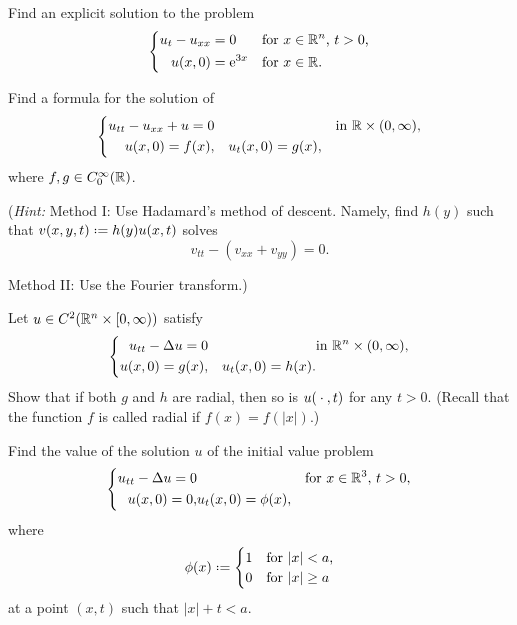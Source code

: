 \begin{problem}
  Find an explicit solution to the problem
  \[
    \left\{
      \begin{aligned}
        u_t-u_{xx}&=0&&\text{for \(x\in\mathbb{R}^n\), \(t>0\),}\\
        u(x,0)&=\mathrm{e}^{3x}&&\text{for \(x\in\mathbb{R}\).}
      \end{aligned}
    \right.
  \]
\end{problem}
\begin{solution*}
\end{solution*}

\begin{problem}
  Find a formula for the solution of
  \[
    \left\{
      \begin{aligned}
        u_{tt}-u_{xx}+u=0&&&&\text{in \(\mathbb{R}\times(0,\infty)\),}\\
        u(x,0)=f(x),&&u_t(x,0)=g(x),
      \end{aligned}
    \right.
  \]
  where \(f,g\in C_0^\infty(\mathbb{R})\).

  \noindent (\emph{Hint:} Method I: Use Hadamard's method of
  descent. Namely, find \(h(y)\) such that \(v(x,y,t)\defeq h(y)u(x,t)\)
  solves
  \[
    v_{tt}-(v_{xx}+v_{yy})=0.
  \]

  \noindent Method II: Use the Fourier transform.)
\end{problem}
\begin{solution*}
\end{solution*}

\begin{problem}
  Let \(u\in C^2(\mathbb{R}^n\times[0,\infty))\) satisfy
  \[
    \left\{
      \begin{aligned}
        u_{tt}-\Delta u=0&&&\text{in \(\mathbb{R}^n\times(0,\infty),\)}\\
        u(x,0)=g(x),&&u_t(x,0)=h(x).
      \end{aligned}
    \right.
  \]
  Show that if both \(g\) and \(h\) are radial, then so is \(u({}\cdot{},t)\)
  for any \(t>0\). (Recall that the function \(f\) is called radial if
  \(f(x)=f(|x|)\).)
\end{problem}
\begin{solution*}
\end{solution*}

\begin{problem}
  Find the value of the solution \(u\) of the initial value problem
  \[
    \left\{
      \begin{aligned}
        u_{tt}-\Delta u=0&&&\text{for \(x\in\bbR^3\), \(t>0\),}\\
        u(x,0)=0,&u_t(x,0)=\phi(x),
      \end{aligned}
    \right.
  \]
  where
  \[
    \phi(x)\defeq
    \begin{cases}
      1&\text{for \(|x|<a\),}\\
      0&\text{for \(|x|\geq a\)}
    \end{cases}
  \]
  at a point \((x,t)\) such that \(|x|+t<a\).
\end{problem}
\begin{solution*}
\end{solution*}

